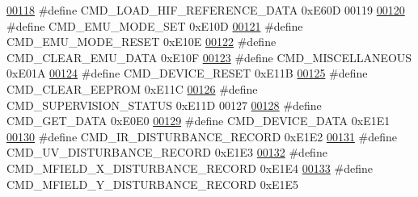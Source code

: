 \begin{DoxyCode}
\hypertarget{a00021_source_l00118}{}\hyperlink{a00021_afc4f83cb04e57ee185a039b10e19e297}{00118} \textcolor{preprocessor}{#define CMD\_LOAD\_HIF\_REFERENCE\_DATA                             0xE60D}
00119 
\hypertarget{a00021_source_l00120}{}\hyperlink{a00021_ac80fdfdbada05f61256bef39c2064330}{00120} \textcolor{preprocessor}{#define CMD\_EMU\_MODE\_SET                                        0xE10D}
\hypertarget{a00021_source_l00121}{}\hyperlink{a00021_a48532ee6ce8c4c41bc6a972f66998ca6}{00121} \textcolor{preprocessor}{#define CMD\_EMU\_MODE\_RESET                                      0xE10E}
\hypertarget{a00021_source_l00122}{}\hyperlink{a00021_aa5f71f685588bc4e978cd6d595a5ea81}{00122} \textcolor{preprocessor}{#define CMD\_CLEAR\_EMU\_DATA                                      0xE10F}
\hypertarget{a00021_source_l00123}{}\hyperlink{a00021_a1c028104d44ece3aca38373da0345c04}{00123} \textcolor{preprocessor}{#define CMD\_MISCELLANEOUS                                       0xE01A}
\hypertarget{a00021_source_l00124}{}\hyperlink{a00021_ac4c8a78ea50054745a0ac0792baa7657}{00124} \textcolor{preprocessor}{#define CMD\_DEVICE\_RESET                                        0xE11B}
\hypertarget{a00021_source_l00125}{}\hyperlink{a00021_a9084e0a84e73318b6fad9841fb4d4f98}{00125} \textcolor{preprocessor}{#define CMD\_CLEAR\_EEPROM                                        0xE11C}
\hypertarget{a00021_source_l00126}{}\hyperlink{a00021_ad6af9210ac0903986f3ac3e55c6816a3}{00126} \textcolor{preprocessor}{#define CMD\_SUPERVISION\_STATUS                                  0xE11D}
00127 
\hypertarget{a00021_source_l00128}{}\hyperlink{a00021_af89ae6f2252e558fc6e54ea9b452bf0e}{00128} \textcolor{preprocessor}{#define CMD\_GET\_DATA                                            0xE0E0}
\hypertarget{a00021_source_l00129}{}\hyperlink{a00021_a4412fcb90fb9171d432a624428881e70}{00129} \textcolor{preprocessor}{#define CMD\_DEVICE\_DATA                                         0xE1E1}
\hypertarget{a00021_source_l00130}{}\hyperlink{a00021_ad37cd290161f0a245d189c3f4e014d4e}{00130} \textcolor{preprocessor}{#define CMD\_IR\_DISTURBANCE\_RECORD                               0xE1E2}
\hypertarget{a00021_source_l00131}{}\hyperlink{a00021_ae45bb46748497c6a117beb1e93072d83}{00131} \textcolor{preprocessor}{#define CMD\_UV\_DISTURBANCE\_RECORD                               0xE1E3}
\hypertarget{a00021_source_l00132}{}\hyperlink{a00021_ab84aea346a3f75b58f8bda67b8ae9be0}{00132} \textcolor{preprocessor}{#define CMD\_MFIELD\_X\_DISTURBANCE\_RECORD                         0xE1E4}
\hypertarget{a00021_source_l00133}{}\hyperlink{a00021_af77e9c0ad32b3cc50d61992d4b64a831}{00133} \textcolor{preprocessor}{#define CMD\_MFIELD\_Y\_DISTURBANCE\_RECORD                         0xE1E5}

\end{DoxyCode}
